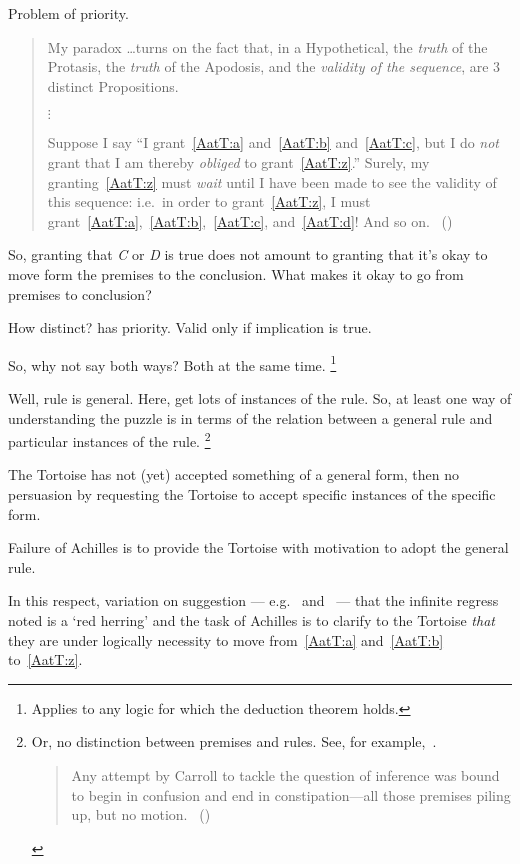\begin{note}
  Problem of priority.
  \begin{quote}
    My paradox \dots turns on the fact that, in a Hypothetical, the \emph{truth} of the Protasis, the \emph{truth} of the Apodosis, and the \emph{validity of the sequence}, are 3 distinct Propositions.

    \mbox{}\hfill\(\vdots\)\hfill\mbox{}

    Suppose I say ``I grant~\ref{AatT:a} and~\ref{AatT:b} and~\ref{AatT:c}, but I do \emph{not} grant that I am thereby \emph{obliged} to grant~\ref{AatT:z}.''
    Surely, my granting~\ref{AatT:z} must \emph{wait} until I have been made to see the validity of this sequence: i.e.\ in order to grant~\ref{AatT:z}, I must grant~\ref{AatT:a},~\ref{AatT:b},~\ref{AatT:c}, and~\ref{AatT:d}! And so on.%
    \mbox{ }\hfill\mbox{(\citeyear[472]{Carroll:1977wl})}
  \end{quote}

  So, granting that \emph{C} or \emph{D} is true does not amount to granting that it's okay to move form the premises to the conclusion.
  What makes it okay to go from premises to conclusion?

  How distinct?
  \citeauthor{Carroll:1977wl} has priority.
  Valid only if implication is true.

  So, why not say both ways?
  Both at the same time.%
  \footnote{
    Applies to any logic for which the deduction theorem holds.
  }

  Well, rule is general.
  Here, get lots of instances of the rule.
  So, at least one way of understanding the puzzle is in terms of the relation between a general rule and particular instances of the rule.%
  \footnote{
    Or, no distinction between premises and rules.
    See, for example,~\textcite{Smiley:1995wk}.
    \begin{quote}
      Any attempt by Carroll to tackle the question of inference was bound to begin in confusion and end in constipation---all those premises piling up, but no motion.\newline
      \mbox{ }\hfill\mbox{(\Citeyear[727]{Smiley:1995wk})}
    \end{quote}
  }

  The Tortoise has not (yet) accepted something of a general form, then no persuasion by requesting the Tortoise to accept specific instances of the specific form.

  Failure of Achilles is to provide the Tortoise with motivation to adopt the general rule.

  In this respect, variation on suggestion --- e.g.\ \textcite[21--22,33]{Thomson:2010tt} and~\textcite[573]{Wisdom:1974uc} ---  that the infinite regress \citeauthor{Carroll:1895uj} noted is a `red herring' and the task of Achilles is to clarify to the Tortoise \emph{that} they are under logically necessity to move from~\ref{AatT:a} and~\ref{AatT:b} to~\ref{AatT:z}.
\end{note}

